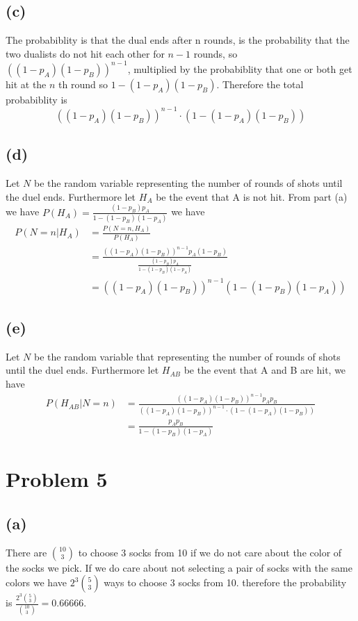 \subsection*{(c)}
The probabiblity is that the dual ends after n rounds, is the probability
that the two dualists do not hit each other for $n-1$ rounds, so $\left((1-p_A)(1-p_B)\right)^{n-1}$,
multiplied by the probabiblity that one or both get hit at the $n$ th round
so $1-(1-p_A)(1-p_B)$. Therefore the total probabiblity is 
$$\boxed{\left((1-p_A)(1-p_B)\right)^{n-1}\cdot(1-(1-p_A)(1-p_B))}$$
\subsection*{(d)}
Let $N$ be the random variable representing the number of rounds
of shots until the duel ends. Furthermore let $H_A$ be the event that A is not hit. 
From part (a) we have $P(H_A)=\frac{(1-p_B)p_A}{1-(1-p_B)(1-p_A)}$
we have
\begin{align*}
    P(N=n|H_A)&=\frac{P(N=n,H_A)}{P(H_A)}\\
    &=\frac{\left((1-p_A)(1-p_B)\right)^{n-1}p_A(1-p_B)}{\frac{(1-p_B)p_A}{1-(1-p_B)(1-p_A)}}\\
    &=\boxed{\left((1-p_A)(1-p_B)\right)^{n-1}\left(1-(1-p_B)(1-p_A)\right)}
\end{align*}
\subsection*{(e)}
Let $N$ be the random variable that representing the number of rounds
of shots until the duel ends. Furthermore let $H_{AB}$ be the event that A and B are hit, we have
\begin{align*}
    P(H_{AB}|N=n)&=\frac{\left((1-p_A)(1-p_B)\right)^{n-1}p_Ap_B}{\left((1-p_A)(1-p_B)\right)^{n-1}\cdot(1-(1-p_A)(1-p_B))}\\
    &=\boxed{\frac{p_Ap_B}{1-(1-p_B)(1-p_A)}}
\end{align*}

\section*{Problem 5}
\subsection*{(a)}
There are $10\choose 3$ to choose 3 socks from 10 if we do not
care about the color of the socks we pick. If we do care about
not selecting a pair of socks with the same colors we have
$2^3{5\choose 3}$ ways to choose 3 socks from 10.
therefore the probability is $\frac{2^3{5\choose 3}}{{10\choose 3}}=\boxed{0.66666}$.
